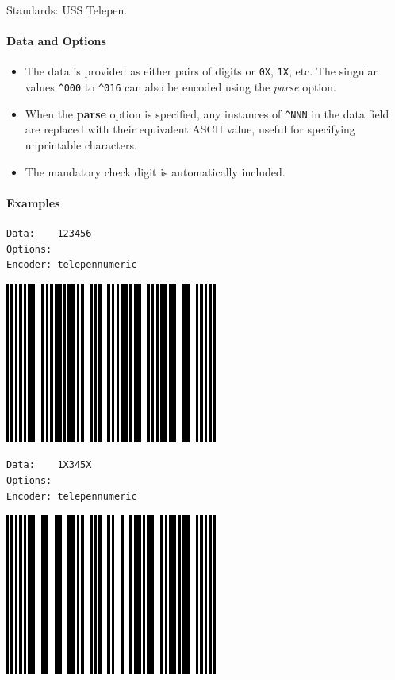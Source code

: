 Standards: USS Telepen.

\hypertarget{data-and-options-78}{%
\paragraph{Data and Options}\label{data-and-options-78}}

\begin{itemize}
\tightlist
\item
  The data is provided as either pairs of digits or \texttt{0X},
  \texttt{1X}, etc. The singular values \texttt{\^{}000} to
  \texttt{\^{}016} can also be encoded using the \emph{parse} option.
\item
  When the \textbf{parse} option is specified, any instances of
  \texttt{\^{}NNN} in the data field are replaced with their equivalent
  ASCII value, useful for specifying unprintable characters.
\item
  The mandatory check digit is automatically included.
\end{itemize}

\hypertarget{examples-51}{%
\paragraph{Examples}\label{examples-51}}

\begin{verbatim}
Data:    123456
Options: 
Encoder: telepennumeric
\end{verbatim}

\includegraphics{images/telepen-3.eps}

\begin{verbatim}
Data:    1X345X
Options: 
Encoder: telepennumeric
\end{verbatim}

\includegraphics{images/telepen-4.eps}

